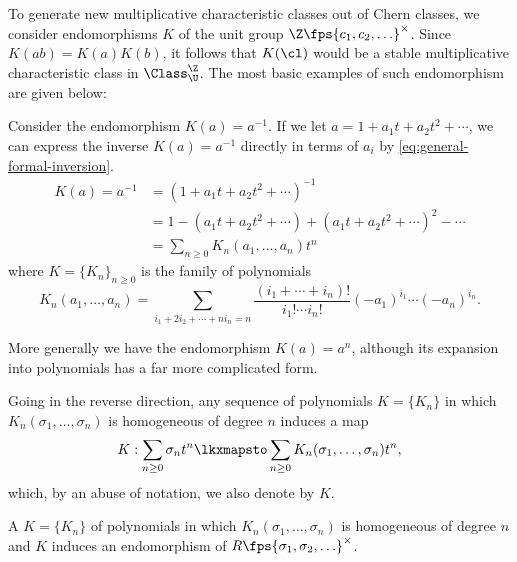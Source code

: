 To generate new multiplicative characteristic classes out of Chern classes, we consider endomorphisms $K$ of the unit group $\Z\fps{c_1,c_2,\ldots}^\times$. Since $K(ab)=K(a)K(b)$, it follows that $K(\cl)$ would be a stable multiplicative characteristic class in $\Class^\Z_{\U}$. The most basic examples of such endomorphism are given below:

\begin{example}
Consider the endomorphism $K(a)=a^{-1}$.
If we let $a=1+a_1t+a_2t^2+\cdots$, we can express the inverse $K(a)=a^{-1}$ directly in terms of $a_i$ by \cref{eq:general-formal-inversion}. 
\begin{equation}\label{eq:chern-inverse-non-symmetric}
	\begin{aligned}
		K(a)=a^{-1} & = (1+a_1t+a_2t^2+\cdots)^{-1}                              \\
		            & = 1-(a_1t+a_2t^2+\cdots) + (a_1t+a_2t^2+\cdots)^2 - \cdots \\
		            & = \sum_{n\geq 0} K_n(a_1,\ldots, a_n)t^n
	\end{aligned}
\end{equation}
where $K=\{K_n\}_{n\geq 0}$ is the family of polynomials
\begin{equation}\label{eq:inverse-K-series}
	K_n(a_1,\ldots, a_n) = \sum_{i_1+2i_2+\cdots+ ni_n=n}\frac{(i_1+\cdots+i_n)!}{i_1!\cdots i_n!}(-a_1)^{i_1}\cdots(-a_n)^{i_n}.
\end{equation}
\end{example}

\begin{example}
	More generally we have the endomorphism $K(a)=a^n$, although its expansion into polynomials has a far more complicated form.
\end{example}

Going in the reverse direction, any sequence of polynomials $K=\{K_n\}$ in which $K_n(\sigma_1,\ldots, \sigma_n)$ is homogeneous of degree $n$ induces a map
\begin{equation}\label{eq:multiplicative-sequence-endomorphism}
	K : \sum_{n\geq 0} \sigma_n t^n \lkxmapsto \sum_{n\geq 0} K_n(\sigma_1,\ldots, \sigma_n) t^n,
\end{equation}
which, by an abuse of notation, we also denote by $K$. 

\begin{definition}
	A  $K=\{K_n\}$ of polynomials in which $K_n(\sigma_1,\ldots, \sigma_n)$ is homogeneous of degree $n$ and $K$ induces an endomorphism of $R\fps{\sigma_1,\sigma_2,\ldots}^\times$.
\end{definition}


